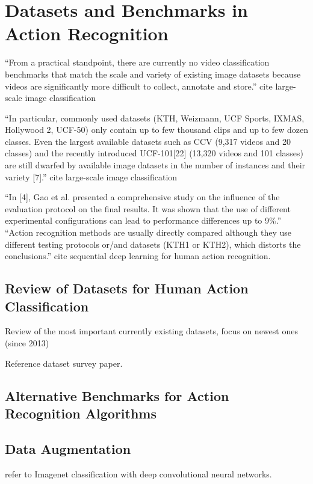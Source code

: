\section{Datasets and Benchmarks in Action Recognition}
\label{chap:datasets}

``From a practical standpoint, there are currently no video classification benchmarks that match the scale and variety of existing image datasets because videos are significantly more difficult to collect, annotate and store.'' cite large-scale image classification

``In particular, commonly used datasets (KTH, Weizmann, UCF Sports, IXMAS, Hollywood 2, UCF-50) only contain up to few thousand clips and up to few dozen classes.
Even the largest available datasets such as CCV (9,317 videos and 20 classes) and the recently introduced UCF-101[22] (13,320 videos and 101 classes) are still dwarfed by available image datasets in the number of instances and their variety [7].'' cite large-scale image classification

``In [4], Gao et al. presented a comprehensive study on the influence of the evaluation protocol on the final results. It was shown that the use of different experimental configurations can lead to performance differences up to 9\%.''
``Action recognition methods are usually directly compared although they use different testing protocols or/and datasets (KTH1 or KTH2), which distorts the conclusions.''
cite sequential deep learning for human action recognition.

\subsection{Review of Datasets for Human Action Classification}
Review of the most important currently existing datasets, focus on newest ones (since 2013)

Reference dataset survey paper.

\subsection{Alternative Benchmarks for Action Recognition Algorithms}

\subsection{Data Augmentation}

refer to Imagenet classification with deep convolutional neural networks.

